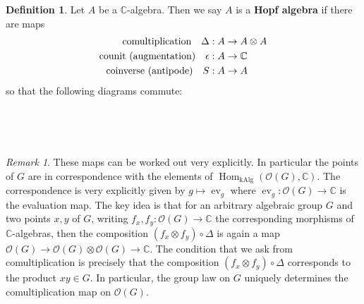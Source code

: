 \documentclass{amsart}
\newcommand{\cO}{{\mathcal{O}}}
\DeclareMathOperator{\Hom}{Hom}
\DeclareMathOperator{\kAlg}{kAlg}
\DeclareMathOperator{\id}{id}
\DeclareMathOperator{\ev}{ev}
\newcommand{\C}{\mathbb{C}}
\numberwithin{equation}{section}
\theoremstyle{plain} %
\theoremstyle{definition}
\newtheorem{definition}[equation]{Definition}
\theoremstyle{remark}
\newtheorem{remark}[equation]{Remark}
\begin{document}
\begin{definition}\label{def:hopf}
	Let $A$ be a $\C$-algebra. Then we say $A$ is a \textbf{Hopf algebra} if there are maps \begin{align*}
		\text{comultiplication\quad}\Delta: A        & \to A\otimes A \\
		\text{counit (augmentation)\quad}\epsilon: A & \to \C         \\
		\text{coinverse (antipode)\quad}S: A         & \to A
	\end{align*}
	so that the following diagrams commute:
	\begin{center}
		 \\
		\vspace{5mm}
		 \\
		\vspace{5mm}

	\end{center}
\end{definition}



\begin{remark}
	These maps can be worked out very explicitly. In particular the points of $G$ are in correspondence with the elements of $\Hom_{\kAlg}(\cO(G),\C)$.
	The correspondence is very explicitly given by $g\mapsto \ev_g$ where $\ev_g: \cO(G)\to \C$ is the evaluation map.
	The key idea is that for an arbitrary algebraic group $G$ and two points $x,y$ of $G$, writing
	$f_x,f_y: \cO(G)\to \C$ the corresponding morphisms of $\C$-algebras, then the composition $(f_x\otimes f_y)\circ \Delta$ is again a map $\cO(G)\to \cO(G)\otimes \cO(G)\to \C$.
	The condition that we ask from comultiplication is precisely that the composition $(f_x\otimes f_y)\circ \Delta$
	corresponds to the product $xy\in G$. In particular, the group law on $G$ uniquely determines the comultiplication map on $\cO(G)$.
\end{remark}
\end{document}

